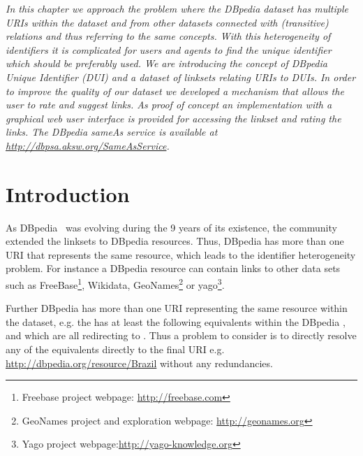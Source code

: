 \textit{In this chapter we approach the problem where the DBpedia dataset has multiple URIs within the dataset and from other datasets connected with (transitive)  relations and thus referring to the same concepts.
With this heterogeneity of identifiers it is complicated for users and agents to find the unique identifier which should be preferably used.
We are introducing the concept of DBpedia Unique Identifier (DUI) and a dataset of linksets relating URIs to DUIs.
In order to improve the quality of our dataset we developed a mechanism that allows the user to rate and suggest links.
As proof of concept an implementation with a graphical web user interface is provided for accessing the linkset and rating the links.
The DBpedia sameAs service is available at \url{http://dbpsa.aksw.org/SameAsService}.}

\section{Introduction}


As DBpedia~\cite{dbpedia-swj} was evolving during the 9 years of its existence, the community extended the linksets to DBpedia resources.
Thus, DBpedia has more than one URI that represents the same resource, which leads to the identifier heterogeneity problem. 
For instance a DBpedia resource can contain  links to other data sets such as FreeBase\footnote{Freebase project webpage: \url{http://freebase.com}}, Wikidata, GeoNames\footnote{GeoNames project and exploration webpage: \url{http://geonames.org}} or yago\footnote{Yago project webpage:\url{http://yago-knowledge.org}}.

Further DBpedia has more than one URI representing the same resource within the dataset, e.g. the  has at least the following equivalents within the DBpedia ,  and  which are all redirecting to .
Thus a problem to consider is to directly resolve any of the equivalents directly to the final URI e.g. \url{http://dbpedia.org/resource/Brazil} without any redundancies.


